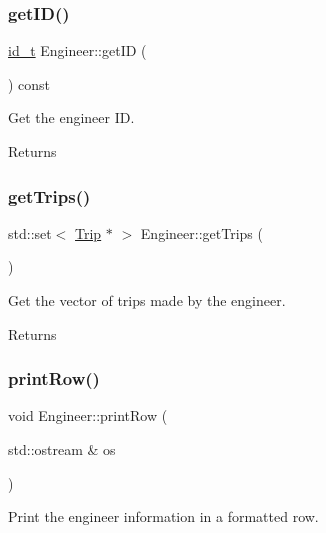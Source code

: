 \subsubsection{\texorpdfstring{get\+I\+D()}{getID()}}
{\footnotesize\ttfamily \mbox{\hyperlink{project__utils_8h_a8f3a969054ad2200720b96e7e23dd4e1}{id\+\_\+t}} Engineer\+::get\+ID (\begin{DoxyParamCaption}{ }\end{DoxyParamCaption}) const}

Get the engineer ID.

\begin{DoxyReturn}{Returns}

\end{DoxyReturn}
\mbox{\label{classEngineer_af2dd8a34a1f90956e9c31043638518cf}} 
\subsubsection{\texorpdfstring{get\+Trips()}{getTrips()}}
{\footnotesize\ttfamily std\+::set$<$ \mbox{\hyperlink{classTrip}{Trip}} $\ast$ $>$ Engineer\+::get\+Trips (\begin{DoxyParamCaption}{ }\end{DoxyParamCaption})}

Get the vector of trips made by the engineer.

\begin{DoxyReturn}{Returns}

\end{DoxyReturn}
\mbox{\label{classEngineer_a75fdfc733d86cb8dc2ff243994716da1}} 
\subsubsection{\texorpdfstring{print\+Row()}{printRow()}}
{\footnotesize\ttfamily void Engineer\+::print\+Row (\begin{DoxyParamCaption}\item[{std\+::ostream \&}]{os }\end{DoxyParamCaption})}

Print the engineer information in a formatted row.


